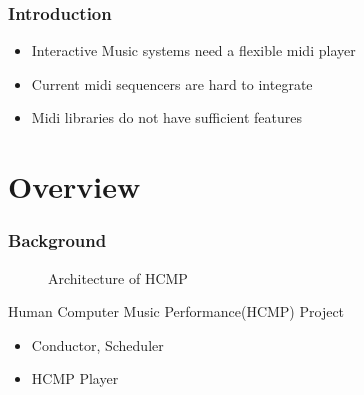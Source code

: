 \documentclass[t]{beamer}
\subtitle{A Proposal for a Music Player \\ for the Human Computer Music Performance Project}
\date{\today}
\author[]{Dalong Cheng\textless dalongc@andrew.cmu.edu\textgreater}
\institute{Institution (Not Used)}
\begin{document}
\maketitle

\begin{frame}
\frametitle{Introduction}
  \begin{itemize}
    \item Interactive Music systems need a flexible midi player 
    \item Current midi sequencers are hard to integrate 
    \item Midi libraries do not have sufficient features 
  \end{itemize}
\end{frame}


\section{Overview}

\begin{frame}
\frametitle{Background}
\begin{figure}[H] %
\caption{Architecture of HCMP}
\end{figure}
Human Computer Music Performance(HCMP) Project
  \begin{itemize}
    \item Conductor, Scheduler 
    \item HCMP Player 
  \end{itemize}
\end{frame}
\end{document}
